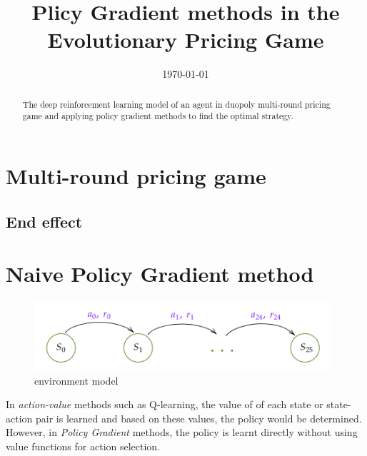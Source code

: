 \documentclass[a4paper,12pt]{article}  %
\title{%
	Plicy Gradient methods in the Evolutionary Pricing Game
}
\author{
}
\date{\today
	\\[1ex]
}
\theoremstyle{definition}
\begin{document}
	\maketitle
	
	\begin{abstract}
		The deep reinforcement learning model of an agent in duopoly multi-round pricing game and applying policy gradient methods to find the optimal strategy. 
		
	\end{abstract}

	\section{Multi-round pricing game}
	\subsection{End effect}
	
	\section{Naive Policy Gradient method}
	
	
	
	\begin{figure}[hbt]
		\centering
		\includegraphics[width=11cm]{states_model}
		\caption{environment model}
		\label{f1equi}
	\end{figure}
	
	In \textit{action-value} methods such as Q-learning, the value of of each state or state-action pair is learned and based on these values, the policy would be determined.
	However, in \textit{Policy Gradient} methods, the policy is learnt directly without using value functions for action selection.
	
\end{document}
